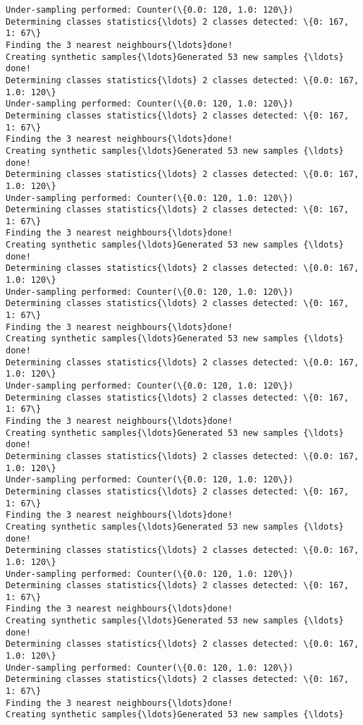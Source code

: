 \documentclass{article}
\begin{document}
\begin{Verbatim}[commandchars=\\\{\}]
Under-sampling performed: Counter(\{0.0: 120, 1.0: 120\})
Determining classes statistics{\ldots} 2 classes detected: \{0: 167, 1: 67\}
Finding the 3 nearest neighbours{\ldots}done!
Creating synthetic samples{\ldots}Generated 53 new samples {\ldots}
done!
Determining classes statistics{\ldots} 2 classes detected: \{0.0: 167, 1.0: 120\}
Under-sampling performed: Counter(\{0.0: 120, 1.0: 120\})
Determining classes statistics{\ldots} 2 classes detected: \{0: 167, 1: 67\}
Finding the 3 nearest neighbours{\ldots}done!
Creating synthetic samples{\ldots}Generated 53 new samples {\ldots}
done!
Determining classes statistics{\ldots} 2 classes detected: \{0.0: 167, 1.0: 120\}
Under-sampling performed: Counter(\{0.0: 120, 1.0: 120\})
Determining classes statistics{\ldots} 2 classes detected: \{0: 167, 1: 67\}
Finding the 3 nearest neighbours{\ldots}done!
Creating synthetic samples{\ldots}Generated 53 new samples {\ldots}
done!
Determining classes statistics{\ldots} 2 classes detected: \{0.0: 167, 1.0: 120\}
Under-sampling performed: Counter(\{0.0: 120, 1.0: 120\})
Determining classes statistics{\ldots} 2 classes detected: \{0: 167, 1: 67\}
Finding the 3 nearest neighbours{\ldots}done!
Creating synthetic samples{\ldots}Generated 53 new samples {\ldots}
done!
Determining classes statistics{\ldots} 2 classes detected: \{0.0: 167, 1.0: 120\}
Under-sampling performed: Counter(\{0.0: 120, 1.0: 120\})
Determining classes statistics{\ldots} 2 classes detected: \{0: 167, 1: 67\}
Finding the 3 nearest neighbours{\ldots}done!
Creating synthetic samples{\ldots}Generated 53 new samples {\ldots}
done!
Determining classes statistics{\ldots} 2 classes detected: \{0.0: 167, 1.0: 120\}
Under-sampling performed: Counter(\{0.0: 120, 1.0: 120\})
Determining classes statistics{\ldots} 2 classes detected: \{0: 167, 1: 67\}
Finding the 3 nearest neighbours{\ldots}done!
Creating synthetic samples{\ldots}Generated 53 new samples {\ldots}
done!
Determining classes statistics{\ldots} 2 classes detected: \{0.0: 167, 1.0: 120\}
Under-sampling performed: Counter(\{0.0: 120, 1.0: 120\})
Determining classes statistics{\ldots} 2 classes detected: \{0: 167, 1: 67\}
Finding the 3 nearest neighbours{\ldots}done!
Creating synthetic samples{\ldots}Generated 53 new samples {\ldots}
done!
Determining classes statistics{\ldots} 2 classes detected: \{0.0: 167, 1.0: 120\}
Under-sampling performed: Counter(\{0.0: 120, 1.0: 120\})
Determining classes statistics{\ldots} 2 classes detected: \{0: 167, 1: 67\}
Finding the 3 nearest neighbours{\ldots}done!
Creating synthetic samples{\ldots}Generated 53 new samples {\ldots}

\end{Verbatim}
\end{document}
